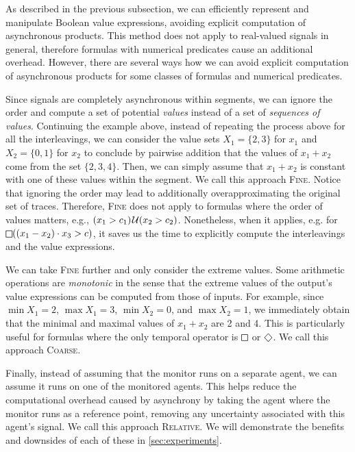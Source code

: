 As described in the previous subsection, we can efficiently represent and manipulate Boolean value expressions, avoiding explicit computation of asynchronous products.
This method does not apply to real-valued signals in general, therefore formulas with numerical predicates cause an additional overhead.
However, there are several ways how we can avoid explicit computation of asynchronous products for some classes of formulas and numerical predicates.

Since signals are completely asynchronous within segments, we can ignore the order and compute a set of potential \emph{values} instead of a set of \emph{sequences of values}.
Continuing the example above, instead of repeating the process above for all the interleavings, we can consider the value sets $X_1 = \{2,3\}$ for $x_1$ and $X_2 = \{0,1\}$ for $x_2$ to conclude by pairwise addition that the values of $x_1 + x_2$ come from the set $\{2, 3, 4\}$.
Then, we can simply assume that $x_1 + x_2$ is constant with one of these values within the segment.  
We call this approach \textsc{Fine}.
Notice that ignoring the order may lead to additionally overapproximating the original set of traces.
Therefore, \textsc{Fine} does not apply to formulas where the order of values matters, e.g.,  $(x_1 > c_1) \kern.1em\mathcal{U} (x_2 > c_2)$.
Nonetheless, when it applies, e.g. for $\LTLalways((x_1 - x_2) \cdot x_3 > c)$, it saves us the time to explicitly compute the interleavings and the value expressions.

We can take \textsc{Fine} further and only consider the extreme values.
Some arithmetic operations are \emph{monotonic} in the sense that the extreme values of the output's value expressions can be computed from those of inputs.
For example, since $\min X_1 = 2$, $\max X_1 = 3$, $\min X_2 = 0$, and $\max X_2 = 1$, we immediately obtain that the minimal and maximal values of $x_1 + x_2$ are 2 and 4.
This is particularly useful for formulas where the only temporal operator is $\LTLalways$ or $\LTLeventually$.
We call this approach \textsc{Coarse}.

Finally, instead of assuming that the monitor runs on a separate agent, we can assume it runs on one of the monitored agents.
This helps reduce the computational overhead caused by asynchrony by taking the agent where the monitor runs as a reference point, removing any uncertainty associated with this agent's signal.
We call this approach \textsc{Relative}.
We will demonstrate the benefits and downsides of each of these in \cref{sec:experiments}.